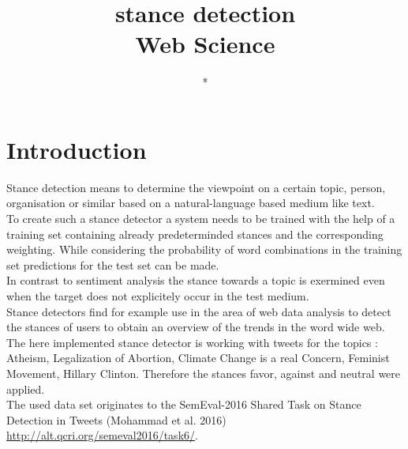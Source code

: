 \documentclass[a4paper,12pt,twoside]{article}
\title{stance detection\\ Web Science }
\author{*}
\begin{document}
\maketitle
\section{Introduction}
Stance detection means to determine the viewpoint on a certain topic, person, organisation or similar based on a natural-language based medium like text.\\ 
To create such a stance detector a system needs to be trained with the help of a training set containing already predeterminded stances and the corresponding weighting. While considering the probability of word combinations in the training set predictions for the test set can be made.\\
In contrast to sentiment analysis the stance towards a topic is exermined even when the target does not explicitely occur in the test medium. \\
Stance detectors find for example use in the area of web data analysis to detect the stances of users to obtain an overview of the trends in the word wide web. \\
The here implemented stance detector is working with tweets for the topics : Atheism, Legalization of Abortion, Climate Change is a real Concern, Feminist Movement, Hillary Clinton. Therefore the stances favor, against and neutral were applied.\\
The used data set originates to the SemEval-2016 Shared Task on Stance Detection in Tweets
(Mohammad et al. 2016) \url{http://alt.qcri.org/semeval2016/task6/}.
\end{document}
